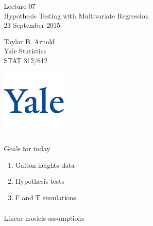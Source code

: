 



\begin{frame}[fragile] \frametitle{}

\vfill

{\fontsize{0.7cm}{0cm}\selectfont Lecture 07 \\\vspace{0.2cm}
Hypothesis Testing with Multivariate Regression}\\\vspace{0.5cm}
23 September 2015

\vspace{2cm}

\begin{minipage}{0.6\textwidth}
Taylor B. Arnold \\
Yale Statistics \\
STAT 312/612
\end{minipage}
\hfill
\begin{minipage}{0.3\textwidth}\raggedleft
\includegraphics[scale=0.3]{../yale-logo.png}
\end{minipage}%

\end{frame}

\begin{frame}[fragile] \frametitle{}

{\color{yaleblue}\fontsize{16pt}{20pt}\selectfont Goals for today}

\begin{enumerate}
\item Galton heights data
\item Hypothesis tests
\item F and T simulations
\end{enumerate}

\end{frame}

\begin{frame}[fragile] \frametitle{}

\begin{flushright}
{\color{yaleblue}\sc\fontsize{1cm}{0cm}\selectfont Linear models assumptions}
\end{flushright}

\end{frame}

